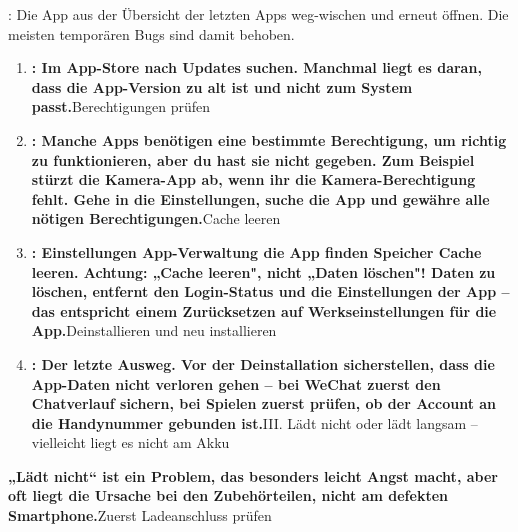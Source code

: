 


: Die App aus der Übersicht der letzten Apps weg-wischen und erneut öffnen. Die meisten temporären Bugs sind damit behoben.


\begin{enumerate}
  \item \textbf{: Im App-Store nach Updates suchen. Manchmal liegt es daran, dass die App-Version zu alt ist und nicht zum System passt.}Berechtigungen prüfen
  \item \textbf{: Manche Apps benötigen eine bestimmte Berechtigung, um richtig zu funktionieren, aber du hast sie nicht gegeben. Zum Beispiel stürzt die Kamera-App ab, wenn ihr die Kamera-Berechtigung fehlt. Gehe in die Einstellungen, suche die App und gewähre alle nötigen Berechtigungen.}Cache leeren
  \item \textbf{: Einstellungen App-Verwaltung die App finden Speicher Cache leeren. Achtung: „Cache leeren", nicht „Daten löschen"! Daten zu löschen, entfernt den Login-Status und die Einstellungen der App – das entspricht einem Zurücksetzen auf Werkseinstellungen für die App.}Deinstallieren und neu installieren
  \item \textbf{: Der letzte Ausweg. Vor der Deinstallation sicherstellen, dass die App-Daten nicht verloren gehen – bei WeChat zuerst den Chatverlauf sichern, bei Spielen zuerst prüfen, ob der Account an die Handynummer gebunden ist.}III. Lädt nicht oder lädt langsam – vielleicht liegt es nicht am Akku
\end{enumerate}

\textbf{„Lädt nicht“ ist ein Problem, das besonders leicht Angst macht, aber oft liegt die Ursache bei den Zubehörteilen, nicht am defekten Smartphone.}Zuerst Ladeanschluss prüfen



